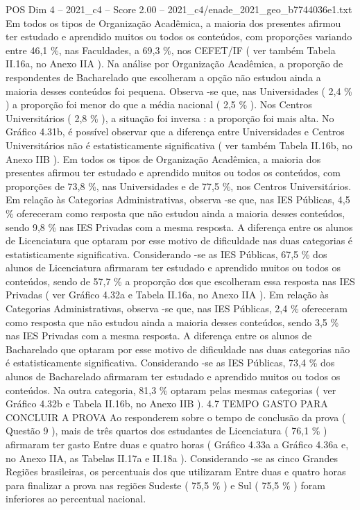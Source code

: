 \begin{textsample}{POS Dim 4 – 2021\_c4 – Score 2.00 – 2021\_c4/enade\_2021\_geo\_b7744036e1.txt}
Em todos os tipos de Organização Acadêmica, a maioria dos presentes afirmou ter estudado e aprendido muitos ou todos os conteúdos, com proporções variando entre 46,1 \%, nas Faculdades, a 69,3 \%, nos CEFET/IF ( ver também Tabela II.16a, no Anexo IIA ).
Na análise por Organização Acadêmica, a proporção de respondentes de Bacharelado que escolheram a opção não estudou ainda a maioria desses conteúdos foi pequena.
Observa -se que, nas Universidades ( 2,4 \% ) a proporção foi menor do que a média nacional ( 2,5 \% ).
Nos Centros Universitários ( 2,8 \% ), a situação foi inversa : a proporção foi mais alta.
No Gráfico 4.31b, é possível observar que a diferença entre Universidades e Centros Universitários não é estatisticamente significativa ( ver também Tabela II.16b, no Anexo IIB ).
Em todos os tipos de Organização Acadêmica, a maioria dos presentes afirmou ter estudado e aprendido muitos ou todos os conteúdos, com proporções de 73,8 \%, nas Universidades e de 77,5 \%, nos Centros Universitários.
Em relação às Categorias Administrativas, observa -se que, nas IES Públicas, 4,5 \% ofereceram como resposta que não estudou ainda a maioria desses conteúdos, sendo 9,8 \% nas IES Privadas com a mesma resposta.
A diferença entre os alunos de Licenciatura que optaram por esse motivo de dificuldade nas duas categorias é estatisticamente significativa.
Considerando -se as IES Públicas, 67,5 \% dos alunos de Licenciatura afirmaram ter estudado e aprendido muitos ou todos os conteúdos, sendo de 57,7 \% a proporção dos que escolheram essa resposta nas IES Privadas ( ver Gráfico 4.32a e Tabela II.16a, no Anexo IIA ).
Em relação às Categorias Administrativas, observa -se que, nas IES Públicas, 2,4 \% ofereceram como resposta que não estudou ainda a maioria desses conteúdos, sendo 3,5 \% nas IES Privadas com a mesma resposta.
A diferença entre os alunos de Bacharelado que optaram por esse motivo de dificuldade nas duas categorias não é estatisticamente significativa.
Considerando -se as IES Públicas, 73,4 \% dos alunos de Bacharelado afirmaram ter estudado e aprendido muitos ou todos os conteúdos.
Na outra categoria, 81,3 \% optaram pelas mesmas categorias ( ver Gráfico 4.32b e Tabela II.16b, no Anexo IIB ). 4.7 TEMPO GASTO PARA CONCLUIR A PROVA Ao responderem sobre o tempo de conclusão da prova ( Questão 9 ), mais de três quartos dos estudantes de Licenciatura ( 76,1 \% ) afirmaram ter gasto Entre duas e quatro horas ( Gráfico 4.33a a Gráfico 4.36a e, no Anexo IIA, as Tabelas II.17a e II.18a ).
Considerando -se as cinco Grandes Regiões brasileiras, os percentuais dos que utilizaram Entre duas e quatro horas para finalizar a prova nas regiões Sudeste ( 75,5 \% ) e Sul ( 75,5 \% ) foram inferiores ao percentual nacional.

\end{textsample}

